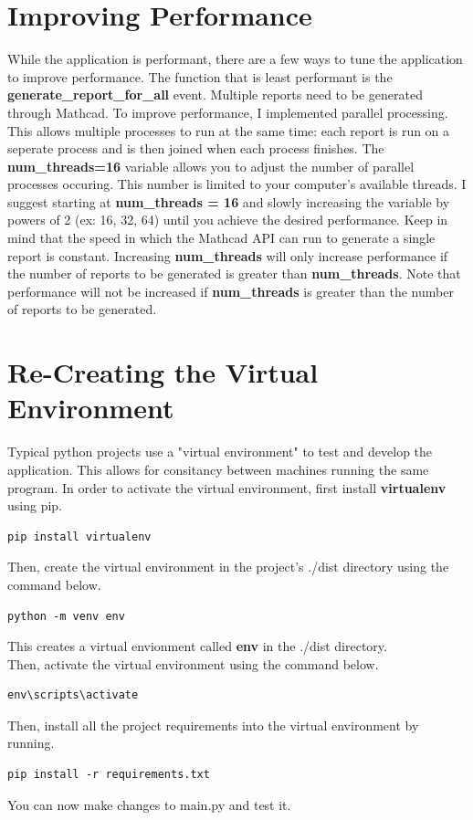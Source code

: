\documentclass[11pt]{article}
\begin{document}
\section{Improving Performance}
\label{sec:orgdcdaf9d}
While the application is performant, there are a few ways to tune the application to improve performance. The function that is least performant is the \textbf{generate\_report\_for\_all} event. Multiple reports need to be generated through Mathcad. To improve performance, I implemented parallel processing. This allows multiple processes to run at the same time: each report is run on a seperate process and is then joined when each process finishes. The \textbf{num\_threads=16} variable allows you to adjust the number of parallel processes occuring. This number is limited to your computer's available threads. I suggest starting at \textbf{num\_threads = 16} and slowly increasing the variable by powers of 2 (ex: 16, 32, 64) until you achieve the desired performance. Keep in mind that the speed in which the Mathcad API can run to generate a single report is constant. Increasing \textbf{num\_threads} will only increase performance if the number of reports to be generated is greater than \textbf{num\_threads}. Note that performance will not be increased if \textbf{num\_threads} is greater than the number of reports to be generated. 

\section{Re-Creating the Virtual Environment}
\label{sec:orgccc3af9d}
Typical python projects use a "virtual environment" to test and develop the application. This allows for consitancy between machines running the same program. In order to activate the virtual environment, first install \textbf{virtualenv} using pip. 
\begin{verbatim}
pip install virtualenv
\end{verbatim}
Then, create the virtual environment in the project's ./dist directory using the command below. 
\begin{verbatim}
python -m venv env 
\end{verbatim}
This creates a virtual envionment called \textbf{env} in the ./dist directory. \\
Then, activate the virtual environment using the command below. 
\begin{verbatim}
env\scripts\activate 
\end{verbatim}
Then, install all the project requirements into the virtual environment by running. 
\begin{verbatim}
pip install -r requirements.txt  
\end{verbatim}
You can now make changes to main.py and test it. 
\end{document}
